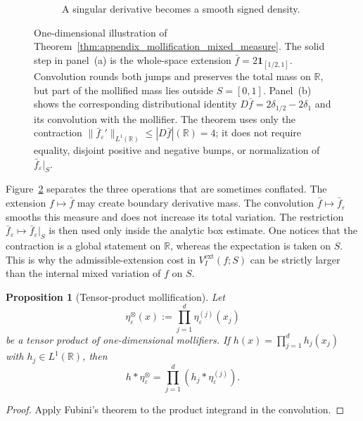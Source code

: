 \documentclass[11pt,letterpaper]{article}
\newtheorem{proposition}[theorem]{Proposition}
\theoremstyle{definition}
\theoremstyle{remark}
\begin{document}
\begin{figure}[H]
\begin{subfigure}[t]{0.49\linewidth}
\begin{tikzpicture}
\end{tikzpicture}
\caption{A singular derivative becomes a smooth signed density.}
\label{fig:appendix_mollification_step_density_derivative}
\end{subfigure}
\caption{One-dimensional illustration of Theorem~\ref{thm:appendix_mollification_mixed_measure}. The solid step in panel~\textup{(a)} is the whole-space extension $\bar f=2\mathbf 1_{[1/2,1]}$. Convolution rounds both jumps and preserves the total mass on $\mathbb R$, but part of the mollified mass lies outside $S=[0,1]$. Panel~\textup{(b)} shows the corresponding distributional identity $D\bar f=2\delta_{1/2}-2\delta_1$ and its convolution with the mollifier. The theorem uses only the contraction $\|\bar f_\varepsilon'\|_{L^1(\mathbb R)}\le |D\bar f|(\mathbb R)=4$; it does not require equality, disjoint positive and negative bumps, or normalization of $\bar f_\varepsilon|_S$.}
\label{fig:appendix_mollification_step_density}
\end{figure}

Figure~\ref{fig:appendix_mollification_step_density} separates the three
operations that are sometimes conflated. The extension $f\mapsto\bar f$ may
create boundary derivative mass. The convolution $\bar f\mapsto\bar
f_\varepsilon$ smooths this measure and does not increase its total variation.
The restriction $\bar f_\varepsilon\mapsto\bar f_\varepsilon|_S$ is then used
only inside the analytic box estimate. One notices that the contraction is a
global statement on $\mathbb R$, whereas the expectation is taken on $S$.
This is why the admissible-extension cost in
$V_I^{\mathrm{ext}}(f;S)$ can be strictly larger than the internal mixed
variation of $f$ on $S$.

\begin{proposition}[Tensor-product mollification]
\label{prop:appendix_tensor_product_mollification}
Let
$$
\eta_\varepsilon^\otimes(x)
:=
\prod_{j=1}^d\eta_\varepsilon^{(j)}(x_j)
$$
be a tensor product of one-dimensional mollifiers. If
$h(x)=\prod_{j=1}^dh_j(x_j)$ with $h_j\in L^1(\mathbb R)$, then
\begin{equation}
\label{eq:appendix_tensor_mollifier_factorization}
h*\eta_\varepsilon^\otimes
=
\prod_{j=1}^d(h_j*\eta_\varepsilon^{(j)}).
\end{equation}
\end{proposition}

\begin{proof}
Apply Fubini's theorem to the product integrand in the convolution.
\end{proof}
\end{document}
